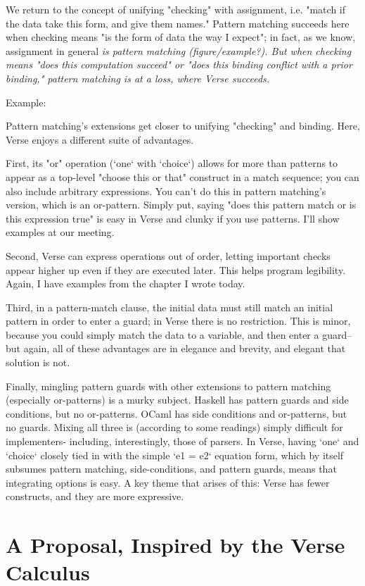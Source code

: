 \documentclass[manuscript,screen,review]{acmart}
\begin{document}
We return to the concept of unifying "checking" with assignment, i.e. "match if
the data take this form, and give them names." Pattern matching succeeds here
when checking means "is the form of data the way I expect"; in fact, as we know,
assignment in general \it{is} pattern matching (figure/example?). But when
checking means "does this computation succeed" or "does this binding conflict
with a prior binding," pattern matching is at a loss, where Verse succeeds. 

Example: 


Pattern matching's extensions get closer to unifying "checking" and binding.
Here, Verse enjoys a different suite of advantages. 

First, its "or" operation (`one` with `choice`) allows for more than patterns to
appear as a top-level "choose this or that" construct in a match sequence; you
can also include arbitrary expressions. You can't do this in pattern matching's
version, which is an or-pattern. Simply put, saying "does this pattern match or
is this expression true" is easy in Verse and clunky if you use patterns. I'll
show examples at our meeting. 

Second, Verse can express operations out of order, letting important checks
appear higher up even if they are executed later. This helps program legibility.
Again, I have examples from the chapter I wrote today. 

Third, in a pattern-match clause, the initial data must still match an initial
pattern in order to enter a guard; in Verse there is no restriction. This is
minor, because you could simply match the data to a variable, and then enter a
guard-- but again, all of these advantages are in elegance and brevity, and
elegant that solution is not. 

Finally, mingling pattern guards with other extensions to pattern matching
(especially or-patterns) is a murky subject. Haskell has pattern guards and side
conditions, but no or-patterns. OCaml has side conditions and or-patterns, but
no guards. Mixing all three is (according to some readings) simply difficult for
implementers- including, interestingly, those of parsers. In Verse, having `one`
and `choice` closely tied in with the simple `e1 = e2` equation form, which by
itself subsumes pattern matching, side-conditions, and pattern guards, means
that integrating options is easy. A key theme that arises of this: Verse has
fewer constructs, and they are more expressive.  

\section{A Proposal, Inspired by the Verse Calculus}
\end{document}
